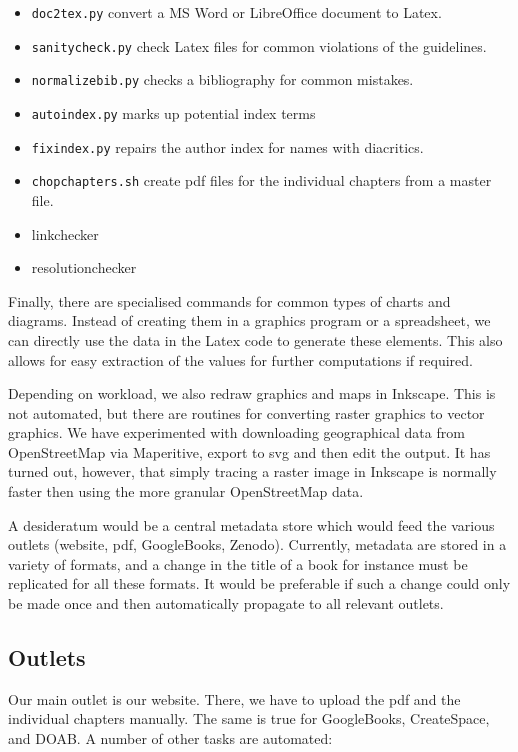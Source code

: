 \documentclass[guidelines,nonflat,modfonts] {langsci/langscibook}
\begin{document}
\begin{itemize}
 \item \texttt{doc2tex.py} convert a MS Word or LibreOffice document to Latex.
 \item \texttt{sanitycheck.py} check Latex files for common violations of the guidelines.
 \item \texttt{normalizebib.py} checks a bibliography for common mistakes. 
 \item \texttt{autoindex.py} marks up potential index terms 
 \item \texttt{fixindex.py} repairs the author index for names with diacritics.
 \item \texttt{chopchapters.sh} create pdf files for the individual chapters from a master file. 
 \item linkchecker %
 \item resolutionchecker %
\end{itemize}

Finally, there are specialised commands for common types of charts and diagrams. Instead of creating them in a graphics program or a spreadsheet, we can directly use the data in the Latex code to generate these elements. This also allows for easy extraction of the values for further computations if required. 

Depending on workload, we also redraw graphics and maps in Inkscape. This is not automated, but there are routines for converting raster graphics to vector graphics. We have experimented with downloading geographical data from OpenStreetMap via Maperitive, export to svg and then edit the output. It has turned out, however, that simply tracing a raster image in Inkscape is normally faster then using the more granular OpenStreetMap data. 

A desideratum would be a central metadata store which would feed the various outlets (website, pdf, GoogleBooks, Zenodo). Currently, metadata are stored in a variety of formats, and a change in the title of a book for instance must be replicated for all these formats. It would be preferable if such a change could only be made once and then automatically propagate to all relevant outlets.

\subsection{Outlets}
Our main outlet is our website. There, we have to upload the pdf and the individual chapters manually. The same is true for GoogleBooks, CreateSpace, and DOAB. A number of other tasks are automated:
\end{document}
